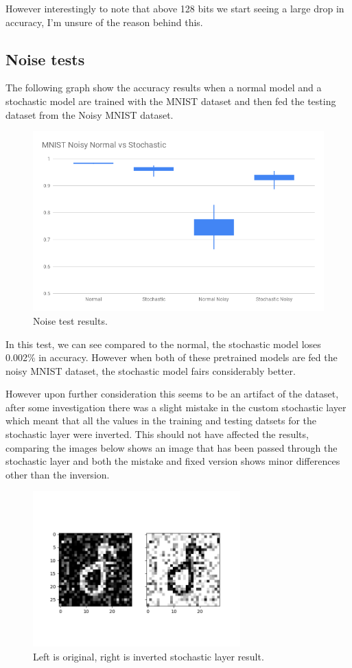 \documentclass[a4paper,oneside,phd,etd]{BYUPhys}
\begin{document}
However interestingly to note that above 128 bits we start seeing a large drop in accuracy, I'm unsure of the reason behind this.

\subsection{Noise tests}
The following graph show the accuracy results when a normal model and a stochastic model are trained with the MNIST dataset and then fed the testing dataset from the Noisy MNIST dataset.
\begin{figure}[H]
\centering
\includegraphics[width=12cm]{results/noise_test.png}
\caption{Noise test results.}
\label{fig:noise}
\end{figure}
In this test, we can see compared to the normal, the stochastic model loses 0.002\% in accuracy. However when both of these pretrained models are fed the noisy MNIST dataset, the stochastic model fairs considerably better.

However upon further consideration this seems to be an artifact of the dataset, after some investigation there was a slight mistake in the custom stochastic layer which meant that all the values in the training and testing datsets for the stochastic layer were inverted. 
This should not have affected the results, comparing the images below shows an image that has been passed through the stochastic layer and both the mistake and fixed version shows minor differences other than the inversion.
\begin{figure}[H]
\centering
\includegraphics[width=8cm]{results/stochastic_layer_pass_inverted.png}
\caption{Left is original, right is inverted stochastic layer result.}
\label{fig:noise_stochastic_inverted}
\end{figure}
\end{document}
